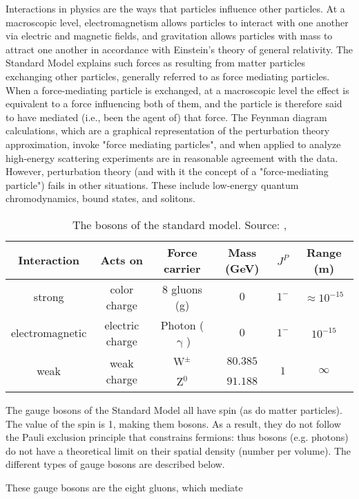Interactions in physics are the ways that particles influence other particles. At a macroscopic level, electromagnetism allows particles to interact with one another via electric and magnetic fields, and gravitation allows particles with mass to attract one another in accordance with Einstein's theory of general relativity. The Standard Model explains such forces as resulting from matter particles exchanging other particles, generally referred to as force mediating particles. When a force-mediating particle is exchanged, at a macroscopic level the effect is equivalent to a force influencing both of them, and the particle is therefore said to have mediated (i.e., been the agent of) that force. The Feynman diagram calculations, which are a graphical representation of the perturbation theory approximation, invoke "force mediating particles", and when applied to analyze high-energy scattering experiments are in reasonable agreement with the data. However, perturbation theory (and with it the concept of a "force-mediating particle") fails in other situations. These include low-energy quantum chromodynamics, bound states, and solitons.
\begin{table}[h]
	\caption[Bosons described by the SM]{The bosons of the standard model. Source: \cite{povh}, \cite{faltermann}}
	\label{tab:ch_1_sm_bosons}
	\begin{tabular}{cccccc}
		\toprule
		Interaction & Acts on & Force carrier & Mass (GeV) & {$J^P$} & Range (m)\\
		\midrule
		strong & color charge & 8 gluons (g) & {$0$} & {$1^-$} & $\approx 10^{-15}$\\
		electromagnetic & electric charge & Photon ($\upgamma$) & {$0$} & {$1^-$} & $10^{-15}$\\
		\multirow{2}{*}{weak} & \multirow{2}{*}{weak charge} & W$^{\pm}$ & {$80.385$} & \multirow{2}{*}{$1$} & \multirow{2}{*}{$\infty$}\\
		 & & Z$^0$ & {$91.188$} & &\\
		\bottomrule
	\end{tabular}
\end{table}
The gauge bosons of the Standard Model all have spin (as do matter particles). The value of the spin is 1, making them bosons. As a result, they do not follow the Pauli exclusion principle that constrains fermions: thus bosons (e.g. photons) do not have a theoretical limit on their spatial density (number per volume). The different types of gauge bosons are described below.

These gauge bosons are the eight gluons, which mediate

